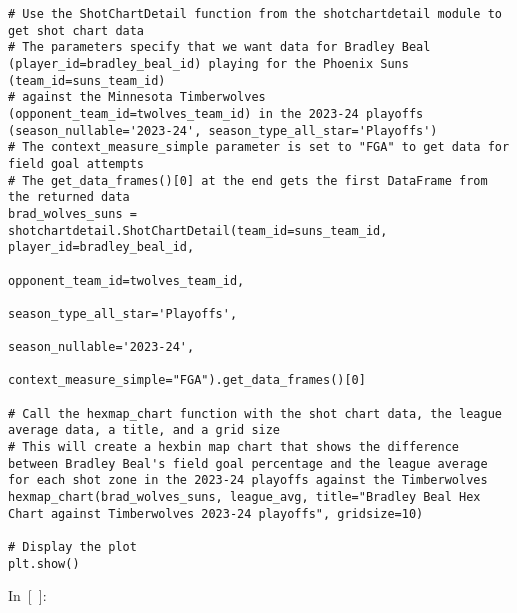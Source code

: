 \begin{verbatim}
# Use the ShotChartDetail function from the shotchartdetail module to get shot chart data
# The parameters specify that we want data for Bradley Beal (player_id=bradley_beal_id) playing for the Phoenix Suns (team_id=suns_team_id)
# against the Minnesota Timberwolves (opponent_team_id=twolves_team_id) in the 2023-24 playoffs (season_nullable='2023-24', season_type_all_star='Playoffs')
# The context_measure_simple parameter is set to "FGA" to get data for field goal attempts
# The get_data_frames()[0] at the end gets the first DataFrame from the returned data
brad_wolves_suns = shotchartdetail.ShotChartDetail(team_id=suns_team_id, player_id=bradley_beal_id,
                                                         opponent_team_id=twolves_team_id,
                                                         season_type_all_star='Playoffs',
                                                         season_nullable='2023-24',
                                                         context_measure_simple="FGA").get_data_frames()[0]

# Call the hexmap_chart function with the shot chart data, the league average data, a title, and a grid size
# This will create a hexbin map chart that shows the difference between Bradley Beal's field goal percentage and the league average for each shot zone in the 2023-24 playoffs against the Timberwolves
hexmap_chart(brad_wolves_suns, league_avg, title="Bradley Beal Hex Chart against Timberwolves 2023-24 playoffs", gridsize=10)

# Display the plot
plt.show()
\end{verbatim}

In~{[}~{]}:

